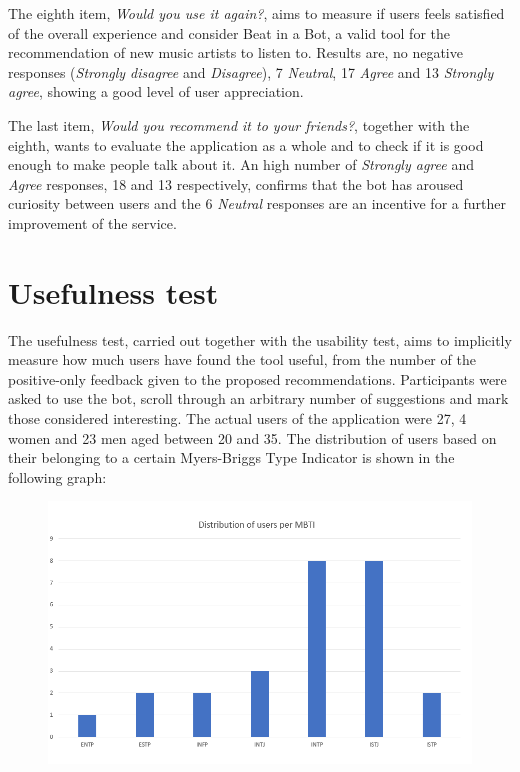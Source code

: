 \documentclass[b5paper,10pt,twoside,cucitura]{toptesi}
\begin{document}
The eighth item, \textit{Would you use it again?}, aims to measure if users feels satisfied of the overall experience and consider Beat in a Bot, a valid tool for the recommendation of new music artists to listen to. Results are, no negative responses (\textit{Strongly disagree} and \textit{Disagree}), 7 \textit{Neutral}, 17 \textit{Agree} and 13 \textit{Strongly agree}, showing a good level of user appreciation.

The last item, \textit{Would you recommend it to your friends?}, together with the eighth, wants to evaluate the application as a whole and to check if it is good enough to make people talk about it. An high number of \textit{Strongly agree} and \textit{Agree} responses, 18 and 13 respectively, confirms that the bot has aroused curiosity between users and the 6 \textit{Neutral} responses are an incentive for a further improvement of the service. 

\section{Usefulness test}

The usefulness test, carried out together with the usability test, aims to implicitly measure how much users have found the tool useful, from the number of the positive-only feedback given to the proposed recommendations. Participants were asked to use the bot, scroll through an arbitrary number of suggestions and mark those considered interesting. The actual users of the application were 27, 4 women and 23 men aged between 20 and 35. The distribution of users based on their belonging to a certain Myers-Briggs Type Indicator is shown in the following graph:

\begin{figure}[ht]
\centering
\includegraphics[width=\textwidth]{users_per_MBTI.png}
\end{figure}
\end{document}
